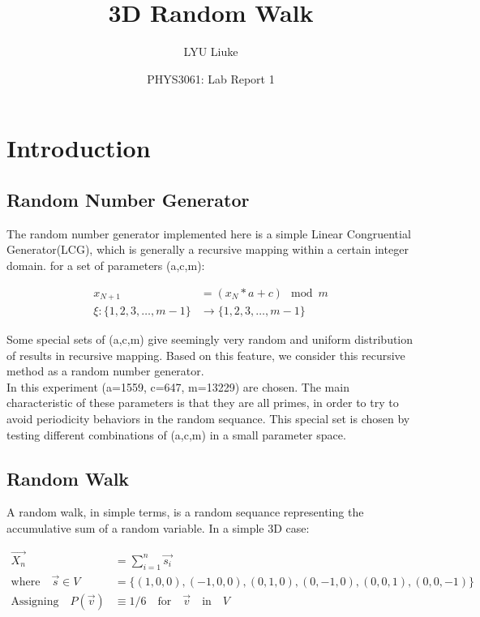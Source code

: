 \documentclass{article}
\title{3D Random Walk}
\author{LYU Liuke}
\date{PHYS3061: Lab Report 1}
\begin{document}
\maketitle
\tableofcontents

\section{Introduction}

\subsection{Random Number Generator}

The random number generator implemented here is a simple Linear Congruential
Generator(LCG), which is generally a recursive mapping within a certain integer
domain. for a set of parameters (a,c,m):

\begin{align*}
  x_{N+1} &= (x_N * a + c) \mod m \\
  \xi \colon \{1,2,3,\dots,m-1\} &\to \{1,2,3,\dots,m-1\}
\end{align*}

Some special sets of (a,c,m) give seemingly very random and uniform distribution
of results in recursive mapping. Based on this feature, we consider this recursive 
method as a random number generator. \\

In this experiment (a=1559, c=647, m=13229) are chosen. 
The main characteristic of these parameters is that they are all primes, in order
to try to avoid periodicity behaviors in the random sequance.
This special set is chosen by testing different combinations of (a,c,m) in a
small parameter space.

\subsection{Random Walk}
  
A random walk, in simple terms, is a random sequance representing the 
accumulative sum of a random variable. In a simple 3D case:

\begin{align*}
  \vec{X_n} &= \sum_{i=1}^{n} \vec{s_i} \\
  \mbox{where} \quad  \vec{s} \in V &= \{(1,0,0), (-1,0,0), (0,1,0), (0,-1,0), (0,0,1),(0,0,-1)\} \\
  \mbox{Assigning} \quad P(\vec{v}) &\equiv 1/6 \quad \mbox{for}  \quad \vec{v } \quad \mbox{in} \quad V
\end{align*}
\end{document}
